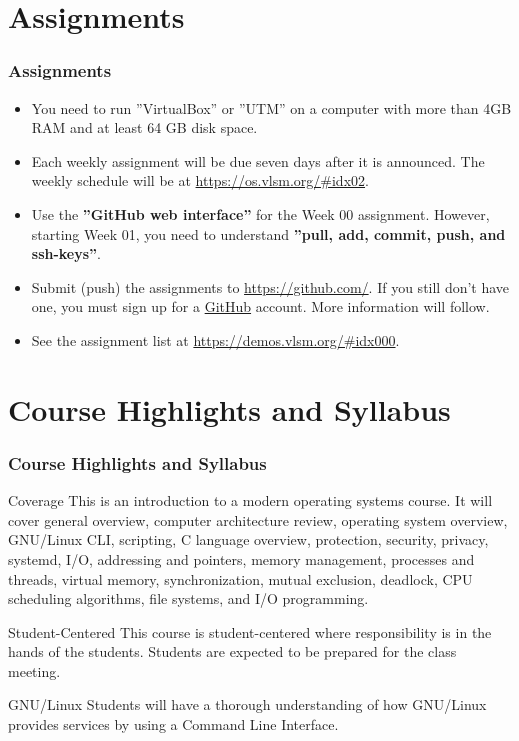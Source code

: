 \documentclass[aspectratio=169, xcolor=table, notheorems, hyperref={pdfpagelabels=false}]{beamer}
\begin{document}
\section{Assignments}
\begin{frame}[fragile]
\frametitle{Assignments}
\begin{itemize}
\item You need to run ''VirtualBox'' or ''UTM'' on a computer with more than 4GB RAM and at least 64 GB disk space.
\item Each weekly assignment will be due seven days after it is announced.
      The weekly schedule will be at \url{https://os.vlsm.org/\#idx02}.
\item Use the \textbf{''GitHub web interface''} for the Week 00 assignment.
      However, starting Week 01, you need to understand \textbf{''pull, add, commit, push, and ssh-keys''}.
\item Submit (push) the assignments to \url{https://github.com/}.
      If you still don't have one, you must sign up for a \href{https://github.com/}{GitHub} account.
      More information will follow.
\item See the assignment list at \url{https://demos.vlsm.org/#idx000}.
\end{itemize}
\end{frame}

\section{Course Highlights and Syllabus} 
\begin{frame}
\frametitle{Course Highlights and Syllabus}
\begin{block}{Coverage}
This is an introduction to a modern operating systems course. 
It will cover
general overview,
computer architecture review,
operating system overview,
GNU/Linux CLI,
scripting,
C language overview,
protection,
security,
privacy,
systemd,
I/O,
addressing and pointers,
memory management, 
processes and threads, 
virtual memory,
synchronization,
mutual exclusion, 
deadlock, 
CPU scheduling algorithms, 
file systems,
and
I/O programming.
\end{block}

\begin{block}{Student-Centered}
This course is student-centered where responsibility is
in the hands of the students. Students are expected to 
be prepared for the class meeting.
\end{block}

\begin{block}{GNU/Linux}
Students will have a thorough understanding of how GNU/Linux 
provides services by using a Command Line Interface.
\end{block}

\end{frame}
\end{document}
